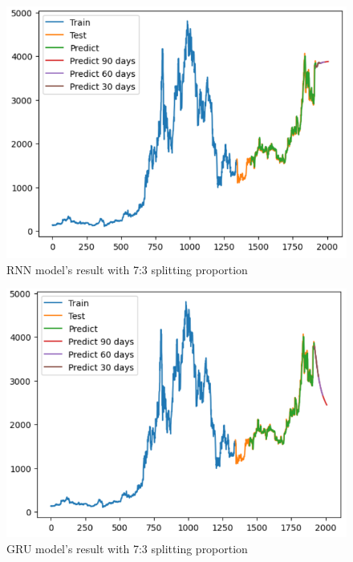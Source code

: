 \documentclass{ieeeojies}
\begin{document}
\begin{figure}[H]
	\centering
	\begin{minipage}{0.6\linewidth}
		\centering
		\includegraphics[width=\linewidth]{bibliography/Images/RNN_ETH_73.PNG}
		\caption{RNN model's result with 7:3 splitting proportion}
	\end{minipage}
\end{figure}
\begin{figure}[H]
	\centering
	\begin{minipage}{0.6\linewidth}
		\centering
		\includegraphics[width=\linewidth]{bibliography/Images/GRU_ETH_73.PNG}
		\caption{GRU model's result with 7:3 splitting proportion}
	\end{minipage}
\end{figure}
\end{document}
